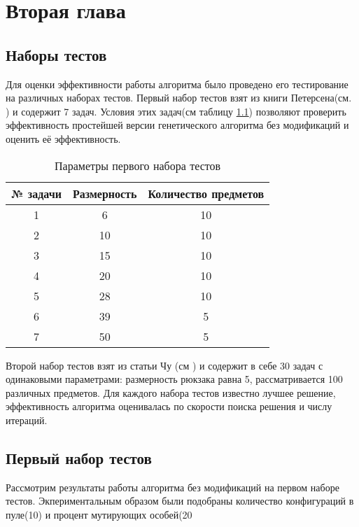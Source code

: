 \chapter{Вторая глава}

\section{Наборы тестов}

Для оценки эффективности работы алгоритма было проведено его тестирование на различных наборах тестов.
Первый набор тестов взят из книги Петерсена(см. \cite{Петерсен1967}) и содержит 7 задач. Условия этих задач(см таблицу \ref{table1}) позволяют проверить эффективность простейшей версии генетического алгоритма без модификаций и оценить её эффективность. %

\begin{table}[ht]%
\centering
\caption{Параметры первого набора тестов}
\label{table1}
\begin{tabular}{|c|c|c|}
\hline
№ задачи & Размерность & Количество предметов \\ \hline
1        & 6           & 10                   \\ \hline
2        & 10          & 10                   \\ \hline
3        & 15          & 10                   \\ \hline
4        & 20          & 10                   \\ \hline
5        & 28          & 10                   \\ \hline
6        & 39          & 5                    \\ \hline
7        & 50          & 5                    \\ \hline
\end{tabular}
\end{table}  

Второй набор тестов взят из статьи Чу (см \cite{Чу1998}) и содержит в себе 30 задач с одинаковыми параметрами: размерность рюкзака равна 5, рассматривается 100 различных предметов.
Для каждого набора тестов известно лучшее решение, эффективность алгоритма оценивалась по скорости поиска решения и числу итераций. 
\section{Первый набор тестов}
Рассмотрим результаты работы алгоритма без модификаций на первом наборе тестов. Экпериментальным образом были подобраны количество конфигураций в пуле(10) и процент мутирующих особей(20%

